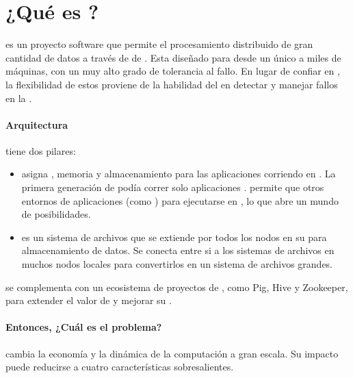 \chapter{¿Qué es \hadoopNAME? \cite{online_hadoop_description}}\label{ap:apendice_hadoop_description}
\apacheNAME \hadoopNAME es un proyecto software \openSourcePC que permite el procesamiento distribuido de gran cantidad de datos a través de \clustersAS de \serversAS. Esta diseñado para \scaleUpQA desde un único \serverAS a miles de máquinas, con un muy alto grado de tolerancia al fallo. En lugar de confiar en \highEndCPT \hardwarePC, la flexibilidad de estos \clustersAS proviene de la habilidad del \softwarePC en detectar y manejar fallos en la \applayer.

\subsubsection*{Arquitectura \highLevelCPT} 
\apacheNAME \hadoopNAME tiene dos pilares:

\begin{itemize}
	\item \hadoopYarnNAME asigna \cpuPC, memoria y almacenamiento para las aplicaciones corriendo en \clustersAS \hadoopNAME. La primera generación de \hadoopNAME podía correr solo aplicaciones \hadoopMapReduceNAME. \hadoopYarnNAME permite que otros entornos de aplicaciones (como \sparkNAME) para ejecutarse en \hadoopNAME, lo que abre un mundo de posibilidades.
	
	\item \hadoophdfsNAME es un sistema de archivos que se extiende por todos los nodos en su \clusterAS \hadoopNAME para almacenamiento de datos. Se conecta entre si a los sistemas de archivos en muchos nodos locales para convertirlos en un sistema de archivos grandes.
\end{itemize}

\hadoopNAME se complementa con un ecosistema de proyectos de \apacheNAME, como Pig\cite{online_ibm_meaning_pig}, Hive\cite{online_ibm_meaning_hive} y Zookeeper\cite{online_ibm_meaning_zookeeper}, para extender el valor de \hadoopNAME y mejorar su \usabilityQA.


\subsubsection*{Entonces, ¿Cuál es el problema?}

\hadoopNAME cambia la economía y la dinámica de la computación a gran escala. Su impacto puede reducirse a cuatro características sobresalientes.

